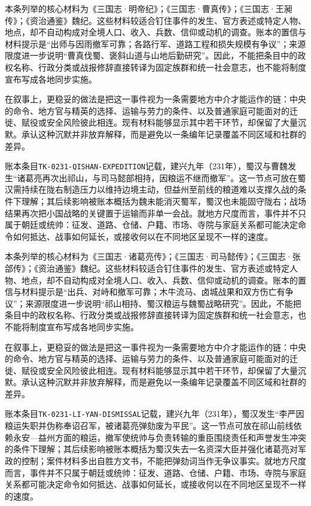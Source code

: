 本条列举的核心材料为《三国志·明帝纪》；《三国志·曹真传》；《三国志·王昶传》；《资治通鉴》魏纪。这些材料较适合钉住事件的发生、官方表述或特定人物、地点，却不自动构成对全境人口、收入、兵数、信仰或动机的调查。账本的置信与材料提示是“出师与因雨撤军可靠；各路行军、道路工程和损失规模有争议”；来源限度进一步说明“曹真伐蜀、褒斜山道与山地后勤研究”。因此，不能把条目中的政权名称、行政分类或战报修辞直接转译为固定族群和统一社会意志，也不能将制度宣布写成各地同步实施。

在叙事上，更稳妥的做法是把这一事件视为一条需要地方中介才能运作的链：中央的命令、地方官与精英的选择、运输与劳力的条件、以及普通家庭可能面对的迁徙、赋役或安全风险彼此相连。现有材料能够显示其中若干环节，却保留了大量沉默。承认这种沉默并非放弃解释，而是避免以一条编年记录覆盖不同区域和社群的差异。

账本条目\texttt{TK-0231-QISHAN-EXPEDITION}记载，建兴九年（231年），蜀汉与曹魏发生“诸葛亮再次出祁山，与司马懿部相持，因粮运不继而撤军”。这一节点可放在蜀汉需持续在陇右制造压力以维持边境主动，但益州至前线的粮道难以支撑久战的条件下理解；其后续影响被账本概括为魏未能消灭蜀军，蜀汉也未能固守陇右；战场结果再次把小国战略的关键置于运输而非单一会战。就地方尺度而言，事件并不只属于朝廷或统帅：征发、道路、仓储、户籍、市场、寺院与家庭关系都可能决定命令如何抵达、战事如何延长，或接收何以在不同地区呈现不一样的速度。

本条列举的核心材料为《三国志·诸葛亮传》；《三国志·司马懿传》；《三国志·张郃传》；《资治通鉴》魏纪。这些材料较适合钉住事件的发生、官方表述或特定人物、地点，却不自动构成对全境人口、收入、兵数、信仰或动机的调查。账本的置信与材料提示是“出兵、对峙和撤军可靠；木牛流马、卤城战果和双方伤亡有争议”；来源限度进一步说明“祁山相持、蜀汉粮运与魏蜀战略研究”。因此，不能把条目中的政权名称、行政分类或战报修辞直接转译为固定族群和统一社会意志，也不能将制度宣布写成各地同步实施。

在叙事上，更稳妥的做法是把这一事件视为一条需要地方中介才能运作的链：中央的命令、地方官与精英的选择、运输与劳力的条件、以及普通家庭可能面对的迁徙、赋役或安全风险彼此相连。现有材料能够显示其中若干环节，却保留了大量沉默。承认这种沉默并非放弃解释，而是避免以一条编年记录覆盖不同区域和社群的差异。

账本条目\texttt{TK-0231-LI-YAN-DISMISSAL}记载，建兴九年（231年），蜀汉发生“李严因粮运失职并伪称奉诏召军，被诸葛亮弹劾废为平民”。这一节点可放在祁山前线依赖永安—益州方面的粮运，撤军使统帅与负责转输的重臣围绕责任和声誉发生冲突的条件下理解；其后续影响被账本概括为蜀汉失去一名资深大臣并强化诸葛亮对军政的控制；案件材料多出自胜方文书，不能把弹劾词当作无争议事实。就地方尺度而言，事件并不只属于朝廷或统帅：征发、道路、仓储、户籍、市场、寺院与家庭关系都可能决定命令如何抵达、战事如何延长，或接收何以在不同地区呈现不一样的速度。

